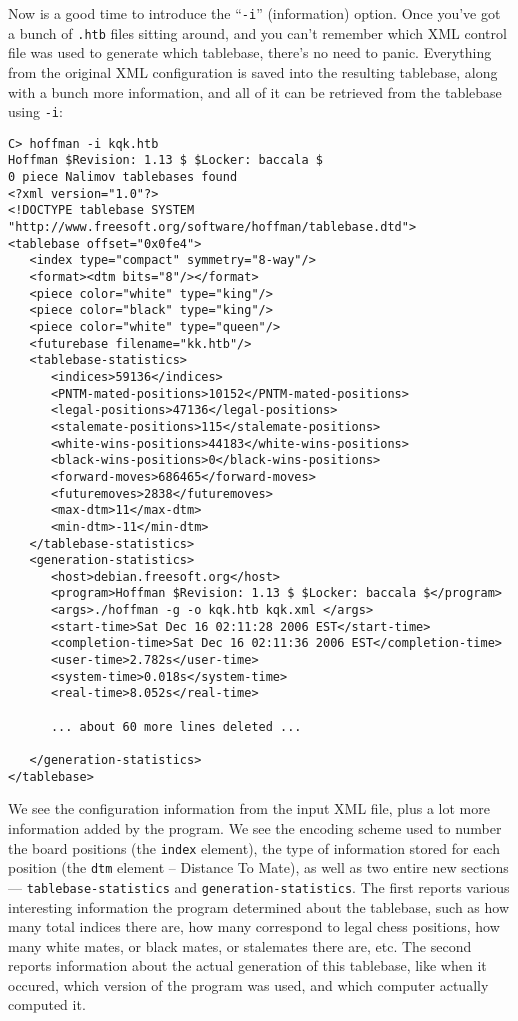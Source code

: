 \documentclass[11pt]{article}
\begin{document}
Now is a good time to introduce the ``{\tt -i}'' (information) option.
Once you've got a bunch of {\tt .htb} files sitting around, and you
can't remember which XML control file was used to generate which
tablebase, there's no need to panic.  Everything from the original XML
configuration is saved into the resulting tablebase, along with a
bunch more information, and all of it can be retrieved from the
tablebase using {\tt -i}:

{\small\begin{verbatim}
C> hoffman -i kqk.htb
Hoffman $Revision: 1.13 $ $Locker: baccala $
0 piece Nalimov tablebases found
<?xml version="1.0"?>
<!DOCTYPE tablebase SYSTEM "http://www.freesoft.org/software/hoffman/tablebase.dtd">
<tablebase offset="0x0fe4">
   <index type="compact" symmetry="8-way"/>
   <format><dtm bits="8"/></format>
   <piece color="white" type="king"/>
   <piece color="black" type="king"/>
   <piece color="white" type="queen"/>
   <futurebase filename="kk.htb"/>
   <tablebase-statistics>
      <indices>59136</indices>
      <PNTM-mated-positions>10152</PNTM-mated-positions>
      <legal-positions>47136</legal-positions>
      <stalemate-positions>115</stalemate-positions>
      <white-wins-positions>44183</white-wins-positions>
      <black-wins-positions>0</black-wins-positions>
      <forward-moves>686465</forward-moves>
      <futuremoves>2838</futuremoves>
      <max-dtm>11</max-dtm>
      <min-dtm>-11</min-dtm>
   </tablebase-statistics>
   <generation-statistics>
      <host>debian.freesoft.org</host>
      <program>Hoffman $Revision: 1.13 $ $Locker: baccala $</program>
      <args>./hoffman -g -o kqk.htb kqk.xml </args>
      <start-time>Sat Dec 16 02:11:28 2006 EST</start-time>
      <completion-time>Sat Dec 16 02:11:36 2006 EST</completion-time>
      <user-time>2.782s</user-time>
      <system-time>0.018s</system-time>
      <real-time>8.052s</real-time>

      ... about 60 more lines deleted ...

   </generation-statistics>
</tablebase>
\end{verbatim}}

We see the configuration information from the input XML file, plus a
 lot more information added by the program.  We see the encoding
 scheme used to number the board positions (the {\tt index} element),
 the type of information stored for each position (the {\tt dtm}
 element -- Distance To Mate), as well as two entire new sections ---
 {\tt tablebase-statistics} and {\tt generation-statistics}.  The
 first reports various interesting information the program determined
 about the tablebase, such as how many total indices there are, how
 many correspond to legal chess positions, how many white mates, or
 black mates, or stalemates there are, etc.  The second reports
 information about the actual generation of this tablebase, like when
 it occured, which version of the program was used, and which computer
 actually computed it.
\end{document}
